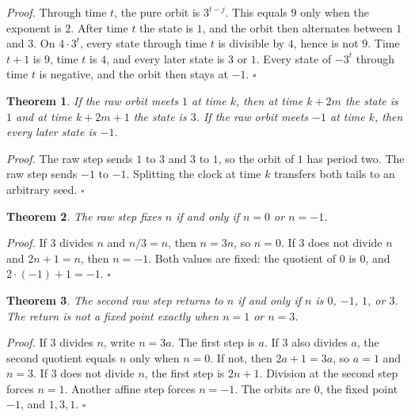 \documentclass[11pt,letterpaper]{article}
\newtheorem{theorem}{Theorem}
\newenvironment{proof}{\noindent\textit{Proof.}}{\hfill\(\square\)}
\begin{document}
\begin{proof}
Through time \(t\), the pure orbit is \(3^{t-j}\). This equals \(9\) only when the exponent is \(2\). After time \(t\) the state is \(1\), and the orbit then alternates between \(1\) and \(3\). On \(4\cdot 3^{t}\), every state through time \(t\) is divisible by \(4\), hence is not \(9\). Time \(t+1\) is \(9\), time \(t\) is \(4\), and every later state is \(3\) or \(1\). Every state of \(-3^{t}\) through time \(t\) is negative, and the orbit then stays at \(-1\).
\end{proof}

\begin{theorem}
\label{thm:tails}
If the raw orbit meets \(1\) at time \(k\), then at time \(k+2m\) the state is \(1\) and at time \(k+2m+1\) the state is \(3\). If the raw orbit meets \(-1\) at time \(k\), then every later state is \(-1\).
\end{theorem}

\begin{proof}
The raw step sends \(1\) to \(3\) and \(3\) to \(1\), so the orbit of \(1\) has period two. The raw step sends \(-1\) to \(-1\). Splitting the clock at time \(k\) transfers both tails to an arbitrary seed.
\end{proof}

\begin{theorem}
\label{thm:fixed}
The raw step fixes \(n\) if and only if \(n=0\) or \(n=-1\).
\end{theorem}

\begin{proof}
If \(3\) divides \(n\) and \(n/3=n\), then \(n=3n\), so \(n=0\). If \(3\) does not divide \(n\) and \(2n+1=n\), then \(n=-1\). Both values are fixed: the quotient of \(0\) is \(0\), and \(2\cdot(-1)+1=-1\).
\end{proof}

\begin{theorem}
\label{thm:periodtwo}
The second raw step returns to \(n\) if and only if \(n\) is \(0\), \(-1\), \(1\), or \(3\). The return is not a fixed point exactly when \(n=1\) or \(n=3\).
\end{theorem}

\begin{proof}
If \(3\) divides \(n\), write \(n=3a\). The first step is \(a\). If \(3\) also divides \(a\), the second quotient equals \(n\) only when \(n=0\). If not, then \(2a+1=3a\), so \(a=1\) and \(n=3\). If \(3\) does not divide \(n\), the first step is \(2n+1\). Division at the second step forces \(n=1\). Another affine step forces \(n=-1\). The orbits are \(0\), the fixed point \(-1\), and \(1,3,1\).
\end{proof}
\end{document}
